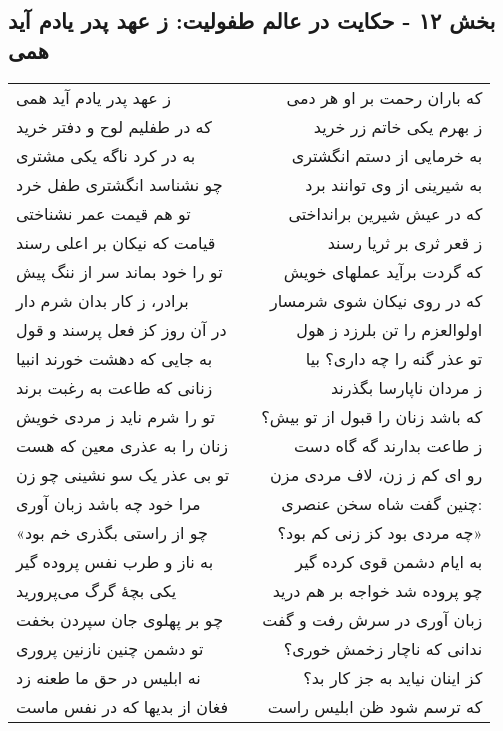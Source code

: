 \begin{center}
\section*{بخش ۱۲ - حکایت در عالم طفولیت: ز عهد پدر یادم آید همی}
\label{sec:012}
\begin{longtable}{l p{0.5cm} r}
ز عهد پدر یادم آید همی
&&
که باران رحمت بر او هر دمی
\\
که در طفلیم لوح و دفتر خرید
&&
ز بهرم یکی خاتم زر خرید
\\
به در کرد ناگه یکی مشتری
&&
به خرمایی از دستم انگشتری
\\
چو نشناسد انگشتری طفل خرد
&&
به شیرینی از وی توانند برد
\\
تو هم قیمت عمر نشناختی
&&
که در عیش شیرین برانداختی
\\
قیامت که نیکان بر اعلی رسند
&&
ز قعر ثری بر ثریا رسند
\\
تو را خود بماند سر از ننگ پیش
&&
که گردت برآید عملهای خویش
\\
برادر، ز کار بدان شرم دار
&&
که در روی نیکان شوی شرمسار
\\
در آن روز کز فعل پرسند و قول
&&
اولوالعزم را تن بلرزد ز هول
\\
به جایی که دهشت خورند انبیا
&&
تو عذر گنه را چه داری؟ بیا
\\
زنانی که طاعت به رغبت برند
&&
ز مردان ناپارسا بگذرند
\\
تو را شرم ناید ز مردی خویش
&&
که باشد زنان را قبول از تو بیش؟
\\
زنان را به عذری معین که هست
&&
ز طاعت بدارند گه گاه دست
\\
تو بی عذر یک سو نشینی چو زن
&&
رو ای کم ز زن، لاف مردی مزن
\\
مرا خود چه باشد زبان آوری
&&
چنین گفت شاه سخن عنصری:
\\
«چو از راستی بگذری خم بود
&&
چه مردی بود کز زنی کم بود؟»
\\
به ناز و طرب نفس پروده گیر
&&
به ایام دشمن قوی کرده گیر
\\
یکی بچهٔ گرگ می‌پرورید
&&
چو پروده شد خواجه بر هم درید
\\
چو بر پهلوی جان سپردن بخفت
&&
زبان آوری در سرش رفت و گفت
\\
تو دشمن چنین نازنین پروری
&&
ندانی که ناچار زخمش خوری؟
\\
نه ابلیس در حق ما طعنه زد
&&
کز اینان نیاید به جز کار بد؟
\\
فغان از بدیها که در نفس ماست
&&
که ترسم شود ظن ابلیس راست
\\

\end{longtable}
\end{center}
